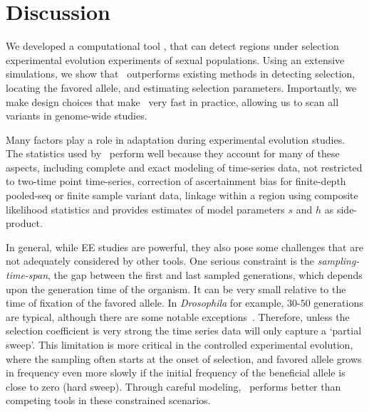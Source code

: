 \documentclass[11pt]{article}
\def\comale{\text{{\sc Comale}}}
\begin{document}
\section{Discussion}

We developed a computational tool \comale, that can detect regions
under selection experimental evolution experiments of sexual
populations. Using an extensive simulations, we show that \comale\
outperforms existing methods in detecting selection, locating the
favored allele, and estimating selection parameters. Importantly, we
make design choices that make \comale\ very fast in practice, allowing
us to scan all variants in genome-wide studies.


Many factors play a role in adaptation during experimental evolution
studies. The statistics used by \comale\ perform well because they
account for many of these aspects, including complete and exact
modeling of time-series data, not restricted to two-time point
time-series, correction of ascertainment bias for finite-depth
pooled-seq or finite sample variant data, linkage within a region
using composite likelihood statistics and provides estimates of model
parameters $s$ and $h$ as side-product.

In general, while EE studies are powerful, they also pose some
challenges that are not adequately considered by other tools. One
serious constraint is the \emph{sampling-time-span}, the gap between
the first and last sampled generations, which depends upon the
generation time of the organism. It can be very small relative to the
time of fixation of the favored allele. In \emph{Drosophila} for
example, $30$-$50$ generations are typical, although there are some
notable exceptions~\cite{zhou2011experimental}.  Therefore, unless the
selection coefficient is very strong the time series data will only
capture a `partial sweep'.  This limitation is more critical in the
controlled experimental evolution, where the sampling often starts at
the onset of selection, and favored allele grows in frequency even
more slowly if the initial frequency of the beneficial allele is close
to zero (hard sweep). Through careful modeling, \comale\ performs
better than competing tools in these constrained scenarios.
\end{document}
